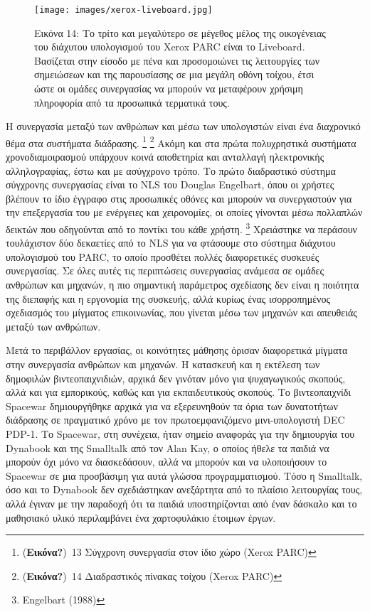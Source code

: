 \documentclass[
]{article}
\begin{document}
\leavevmode{}%
\begin{figure}
\hypertarget{fig:xerox-liveboard}{%
\centering
\texttt{[image: images/xerox-liveboard.jpg]}
\caption{Εικόνα 14: Το τρίτο και μεγαλύτερο σε μέγεθος μέλος της
οικογένειας του διάχυτου υπολογισμού του Xerox PARC είναι το Liveboard.
Βασίζεται στην είσοδο με πένα και προσομοιώνει τις λειτουργίες των
σημειώσεων και της παρουσίασης σε μια μεγάλη οθόνη τοίχου, έτσι ώστε οι
ομάδες συνεργασίας να μπορούν να μεταφέρουν χρήσιμη πληροφορία από τα
προσωπικά τερματικά τους.}\label{fig:xerox-liveboard}
}
\end{figure}

Η συνεργασία μεταξύ των ανθρώπων και μέσω των υπολογιστών είναι ένα
διαχρονικό θέμα στα συστήματα διάδρασης. \footnote{(\textbf{Εικόνα?})~13
  Σύγχρονη συνεργασία στον ίδιο χώρο (Xerox PARC)} \footnote{(\textbf{Εικόνα?})~14
  Διαδραστικός πίνακας τοίχου (Xerox PARC)} Ακόμη και στα πρώτα
πολυχρηστικά συστήματα χρονοδιαμοιρασμού υπάρχουν κοινά αποθετηρία και
ανταλλαγή ηλεκτρονικής αλληλογραφίας, έστω και με ασύγχρονο τρόπο. Το
πρώτο διαδραστικό σύστημα σύγχρονης συνεργασίας είναι το NLS του Douglas
Engelbart, όπου οι χρήστες βλέπουν το ίδιο έγγραφο στις προσωπικές
οθόνες και μπορούν να συνεργαστούν για την επεξεργασία του με ενέργειες
και χειρονομίες, οι οποίες γίνονται μέσω πολλαπλών δεικτών που
οδηγούνται από το ποντίκι του κάθε χρήστη. \footnote{Engelbart (1988)}
Χρειάστηκε να περάσουν τουλάχιστον δύο δεκαετίες από το NLS για να
φτάσουμε στο σύστημα διάχυτου υπολογισμού του PARC, το οποίο προσθέτει
πολλές διαφορετικές συσκευές συνεργασίας. Σε όλες αυτές τις περιπτώσεις
συνεργασίας ανάμεσα σε ομάδες ανθρώπων και μηχανών, η πιο σημαντική
παράμετρος σχεδίασης δεν είναι η ποιότητα της διεπαφής και η εργονομία
της συσκευής, αλλά κυρίως ένας ισορροπημένος σχεδιασμός του μίγματος
επικοινωνίας, που γίνεται μέσω των μηχανών και απευθειάς μεταξύ των
ανθρώπων.

Μετά το περιβάλλον εργασίας, οι κοινότητες μάθησης όρισαν διαφορετικά
μίγματα στην συνεργασία ανθρώπων και μηχανών. Η κατασκευή και η εκτέλεση
των δημοφιλών βιντεοπαιχνιδιών, αρχικά δεν γινόταν μόνο για ψυχαγωγικούς
σκοπούς, αλλά και για εμπορικούς, καθώς και για εκπαιδευτικούς σκοπούς.
Το βιντεοπαιχνίδι Spacewar δημιουργήθηκε αρχικά για να εξερευνηθούν τα
όρια των δυνατοτήτων διάδρασης σε πραγματικό χρόνο με τον
πρωτοεμφανιζόμενο μινι-υπολογιστή DEC PDP-1. Το Spacewar, στη συνέχεια,
ήταν σημείο αναφοράς για την δημιουργία του Dynabook και της Smalltalk
από τον Alan Kay, ο οποίος ήθελε τα παιδιά να μπορούν όχι μόνο να
διασκεδάσουν, αλλά να μπορούν και να υλοποιήσουν το Spacewar σε μια
προσβάσιμη για αυτά γλώσσα προγραμματισμού. Τόσο η Smalltalk, όσο και το
Dynabook δεν σχεδιάστηκαν ανεξάρτητα από το πλαίσιο λειτουργίας τους,
αλλά έγιναν με την παραδοχή ότι τα παιδιά υποστηρίζονται από έναν
δάσκαλο και το μαθησιακό υλικό περιλαμβάνει ένα χαρτοφυλάκιο έτοιμων
έργων.
\end{document}
